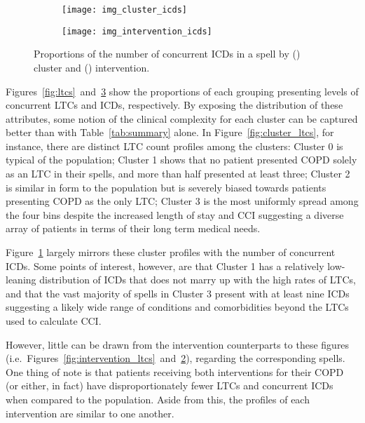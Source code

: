 \begin{figure}
    \centering
    \begin{subfigure}{.5\imgwidth}
        \texttt{[image: img\_cluster\_icds]}
        \caption{}\label{fig:cluster_icds}
    \end{subfigure}\hfill%
    \begin{subfigure}{.5\imgwidth}
        \texttt{[image: img\_intervention\_icds]}
        \caption{}\label{fig:intervention_icds}
    \end{subfigure}
    \caption{%
        Proportions of the number of concurrent ICDs in a spell by
        () cluster and ()
        intervention.
    }\label{fig:icds}
\end{figure}

Figures~\ref{fig:ltcs}~and~\ref{fig:icds} show the proportions of each grouping
presenting levels of concurrent LTCs and ICDs, respectively. By exposing the
distribution of these attributes, some notion of the clinical complexity for
each cluster can be captured better than with Table~\ref{tab:summary} alone. In
Figure~\ref{fig:cluster_ltcs}, for instance, there are distinct LTC count
profiles among the clusters: Cluster 0 is typical of the population; Cluster 1
shows that no patient presented COPD solely as an LTC in their spells, and more
than half presented at least three; Cluster 2 is similar in form to the
population but is severely biased towards patients presenting COPD as the only
LTC; Cluster 3 is the most uniformly spread among the four bins despite the
increased length of stay and CCI suggesting a diverse array of patients in
terms of their long term medical needs.

Figure~\ref{fig:cluster_icds} largely mirrors these cluster profiles with the
number of concurrent ICDs. Some points of interest, however, are that Cluster 1
has a relatively low-leaning distribution of ICDs that does not marry up with
the high rates of LTCs, and that the vast majority of spells in Cluster 3
present with at least nine ICDs suggesting a likely wide range of conditions and
comorbidities beyond the LTCs used to calculate CCI.\

However, little can be drawn from the intervention counterparts to these figures
(i.e.\ Figures~\ref{fig:intervention_ltcs}~and~\ref{fig:intervention_icds}),
regarding the corresponding spells. One thing of note is that patients receiving
both interventions for their COPD (or either, in fact) have disproportionately
fewer LTCs and concurrent ICDs when compared to the population. Aside from this,
the profiles of each intervention are similar to one another.

